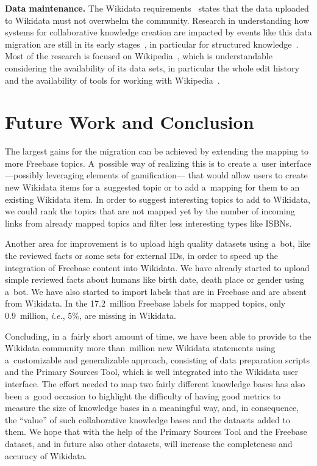 \documentclass{acm_proc_article-sp}
\begin{document}
\textbf{Data maintenance.}
The Wikidata requirements~\cite{wikidatareqs} states that the data uploaded to Wikidata
must not overwhelm the community.
Research in understanding how systems for collaborative knowledge creation are impacted
by events like this data migration are still in its early stages~\cite{moskaliuk2012collaborative},
in particular for structured knowledge~\cite{horridge2014webprotege}.
Most of the research is focused on Wikipedia~\cite{flock2015towards},
which is understandable considering the availability of its data sets,
in particular the whole edit history~\cite{schindler2011introducing}
and the availability of tools for working with Wikipedia~\cite{milne2013open}.


\section{Future Work and Conclusion}\label{sec:future-work-and-conclusion}

The largest gains for the migration can be achieved
by extending the mapping to more Freebase topics.
A~possible way of realizing this is to create a~user interface%
---possibly leveraging elements of gamification---%
that would allow users to create new Wikidata items for a~suggested topic
or to add a~mapping for them to an existing Wikidata item.
In order to suggest interesting topics to add to Wikidata,
we could rank the topics that are not mapped yet by the number of incoming links
from already mapped topics and filter less interesting types like ISBNs.

Another area for improvement is to upload high quality datasets using a~bot,
like the reviewed facts or some sets for external IDs,
in order to speed up the integration of Freebase content into Wikidata.
We have already started to upload simple reviewed facts about humans
like birth date, death place or gender using a~bot.
We have also started to import labels that are in Freebase and are absent from Wikidata.
In the 17.2~million Freebase labels for mapped topics,
only 0.9~million, \emph{i.e.}, 5\%, are missing in Wikidata.

Concluding, in a~fairly short amount of time, we have been able
to provide to the Wikidata community more than~million new Wikidata statements
using a~customizable and generalizable approach, consisting of data preparation scripts
and the Primary Sources Tool,
which is well integrated into the Wikidata user interface.
The effort needed to map two fairly different knowledge bases has also been a~good occasion
to highlight the difficulty of having good metrics to measure the size of knowledge bases
in a meaningful way, 
and, in consequence, the ``value'' of such collaborative knowledge bases and the datasets added to them.
We hope that with the help of the Primary Sources Tool and
the Freebase dataset, and in future also other datasets,
will increase the completeness and accuracy of Wikidata.




\balancecolumns
\end{document}
